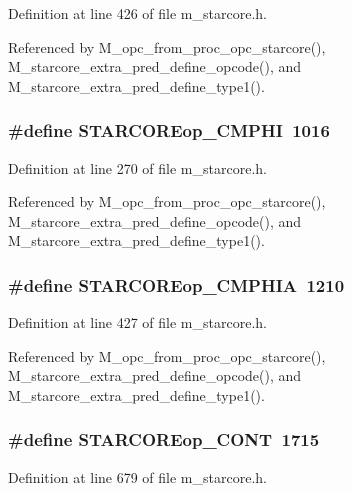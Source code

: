 Definition at line 426 of file m\_\-starcore.h.

Referenced by M\_\-opc\_\-from\_\-proc\_\-opc\_\-starcore(), M\_\-starcore\_\-extra\_\-pred\_\-define\_\-opcode(), and M\_\-starcore\_\-extra\_\-pred\_\-define\_\-type1().
\subsubsection{\setlength{\rightskip}{0pt plus 5cm}\#define STARCOREop\_\-CMPHI~1016}\label{m__starcore_8h_ab2a1350456d78ae1af134892ddbb618}




Definition at line 270 of file m\_\-starcore.h.

Referenced by M\_\-opc\_\-from\_\-proc\_\-opc\_\-starcore(), M\_\-starcore\_\-extra\_\-pred\_\-define\_\-opcode(), and M\_\-starcore\_\-extra\_\-pred\_\-define\_\-type1().
\subsubsection{\setlength{\rightskip}{0pt plus 5cm}\#define STARCOREop\_\-CMPHIA~1210}\label{m__starcore_8h_40468b65c7bcdb82b0257f309a1f342d}




Definition at line 427 of file m\_\-starcore.h.

Referenced by M\_\-opc\_\-from\_\-proc\_\-opc\_\-starcore(), M\_\-starcore\_\-extra\_\-pred\_\-define\_\-opcode(), and M\_\-starcore\_\-extra\_\-pred\_\-define\_\-type1().
\subsubsection{\setlength{\rightskip}{0pt plus 5cm}\#define STARCOREop\_\-CONT~1715}\label{m__starcore_8h_21a93e0c79f35829bc374ff16ea12ed0}




Definition at line 679 of file m\_\-starcore.h.
